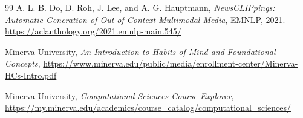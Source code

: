 \documentclass[11pt]{article}
\begin{document}
\begin{thebibliography}{99}
A. L. B. Do, D. Roh, J. Lee, and A. G. Hauptmann,
\emph{NewsCLIPpings: Automatic Generation of Out-of-Context Multimodal Media},
EMNLP, 2021.
\url{https://aclanthology.org/2021.emnlp-main.545/}

Minerva University,
\emph{An Introduction to Habits of Mind and Foundational Concepts},
\url{https://www.minerva.edu/public/media/enrollment-center/Minerva-HCs-Intro.pdf}

Minerva University,
\emph{Computational Sciences Course Explorer},
\url{https://my.minerva.edu/academics/course_catalog/computational_sciences/}

\end{thebibliography}
\end{document}
